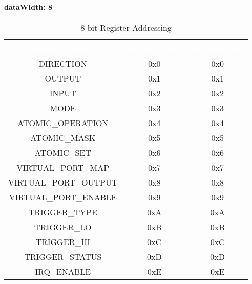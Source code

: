 \paragraph{dataWidth: 8}
\begin{table}[h]
  \centering
  \begin{tabular}{|c|c|c|}
      \hline
      \rowcolor{dark-gray}  %
      \textcolor{white}{\textbf{Register Name}} & \textcolor{white}{\textbf{Address Start}} & \textcolor{white}{\textbf{Address End}} \\ \hline
      DIRECTION & 0x0 & 0x0 \\ \hline
      OUTPUT & 0x1 & 0x1\\ \hline
      INPUT & 0x2 & 0x2 \\ \hline
      MODE & 0x3 & 0x3\\ \hline
      ATOMIC\_OPERATION & 0x4 & 0x4 \\ \hline
      ATOMIC\_MASK & 0x5 & 0x5\\ \hline
      ATOMIC\_SET & 0x6 & 0x6 \\ \hline
      VIRTUAL\_PORT\_MAP & 0x7 & 0x7 \\ \hline
      VIRTUAL\_PORT\_OUTPUT & 0x8 & 0x8 \\ \hline
      VIRTUAL\_PORT\_ENABLE & 0x9 & 0x9\\ \hline
      TRIGGER\_TYPE & 0xA & 0xA\\ \hline
      TRIGGER\_LO & 0xB & 0xB \\ \hline
      TRIGGER\_HI & 0xC & 0xC \\ \hline
      TRIGGER\_STATUS & 0xD & 0xD \\ \hline
      IRQ\_ENABLE & 0xE & 0xE\\ \hline
  \end{tabular}
  \caption{8-bit Register Addressing}
\end{table}

\newpage

